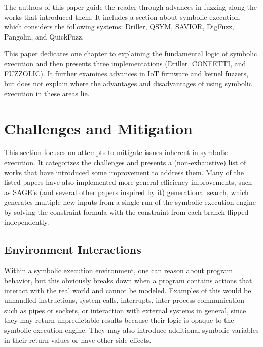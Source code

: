 \documentclass{article}
\begin{document}
\begin{multicols}{2}
    The authors of this paper guide the reader through advances in fuzzing along the works that introduced them. It includes a section about symbolic execution, which considers the following systems: Driller\cite{Driller}, QSYM\cite{QSYM}, SAVIOR\cite{SAVIOR}, DigFuzz\cite{DigFuzz}, Pangolin\cite{Pangolin}, and QuickFuzz\cite{QuickFuzz}.

    This paper dedicates one chapter to explaining the fundamental logic of symbolic execution and then presents three implementations (Driller\cite{Driller}, CONFETTI\cite{CONFETTI}, and FUZZOLIC\cite{FUZZOLIC}). It further examines advances in IoT firmware and kernel fuzzers, but does not explain where the advantages and disadvantages of using symbolic execution in these areas lie.

    \section{Challenges and Mitigation}
    \label{Results}
    This section focuses on attempts to mitigate issues inherent in symbolic execution. It categorizes the challenges and presents a (non-exhaustive) list of works that have introduced some improvement to address them. Many of the listed papers have also implemented more general efficiency improvements, such as SAGE's\cite{SAGE} (and several other papers inspired by it) generational search, which generates multiple new inputs from a single run of the symbolic execution engine by solving the constraint formula with the constraint from each branch flipped independently.

    \subsection{Environment Interactions}
    Within a symbolic execution environment, one can reason about program behavior, but this obviously breaks down when a program contains actions that interact with the real world and cannot be modeled. Examples of this would be unhandled instructions, system calls, interrupts, inter-process communication such as pipes or sockets, or interaction with external systems in general, since they may return unpredictable results because their logic is opaque to the symbolic execution engine.\cite{Demystifying} They may also introduce additional symbolic variables in their return values or have other side effects.


\end{multicols}
\end{document}
